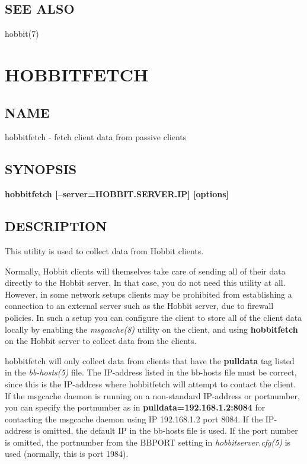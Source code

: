 \subsection{SEE ALSO}
hobbit(7) 

 



%
\newpage
\section{HOBBITFETCH}
\subsection{NAME}
 hobbitfetch - fetch client data from passive clients \
\subsection{SYNOPSIS}
\textbf{hobbitfetch [--server=HOBBIT.SERVER.IP] [options]}


 
\subsection{DESCRIPTION}
 This utility is used to collect data from Hobbit clients. 

  Normally, Hobbit clients will themselves take care of sending all of
  their data directly to the Hobbit server. In that case, you do not
  need this utility at all. However, in some network setups clients
  may be prohibited from establishing a connection to an external
  server such as the Hobbit server, due to firewall policies. In such
  a setup you can configure the client to store all of the client data
  locally by enabling the \emph{msgcache(8)} utility on the client,
  and using \textbf{hobbitfetch} on the Hobbit server to collect data
  from the clients. 



  hobbitfetch will only collect data from clients that have the
  \textbf{pulldata} tag listed in the \emph{bb-hosts(5)} file. The
  IP-address listed in the bb-hosts file must be correct, since this
  is the IP-address where hobbitfetch will attempt to contact the
  client. If the msgcache daemon is running on a non-standard
  IP-address or portnumber, you can specify the portnumber as in
  \textbf{pulldata=192.168.1.2:8084} for contacting the msgcache
  daemon using IP 192.168.1.2 port 8084. If the IP-address is omitted,
  the default IP in the bb-hosts file is used. If the port number is
  omitted, the portnumber from the BBPORT setting in
  \emph{hobbitserver.cfg(5)} is used (normally, this is port 1984). 




